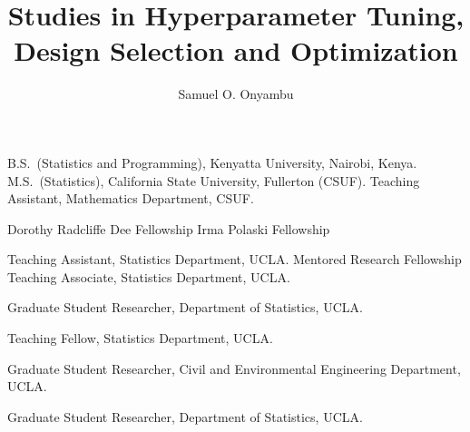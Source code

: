 


\title {Studies in Hyperparameter Tuning, Design Selection and Optimization}

\author{Samuel O. Onyambu}








\dedication{\textsl{To my parents, Joseph and Jane, ---\\
          and my siblings, Tabitha, Naomi, Jasper, and Lilian,---\\
          who among so many other things ensured that I gave my all to accomplish this task.}}


                {B.S.~(Statistics and Programming), Kenyatta University, Nairobi, Kenya.}
                {M.S.~(Statistics), California State University, Fullerton (CSUF).}
                {Teaching Assistant, Mathematics Department, CSUF.}

  {Dorothy Radcliffe Dee Fellowship}
   {Irma Polaski Fellowship}


               {Teaching Assistant, Statistics Department, UCLA.}
 {Mentored Research Fellowship}
               {Teaching Associate, Statistics Department, UCLA.} 

                {Graduate Student Researcher, Department of Statistics, UCLA.}

 {Teaching Fellow, Statistics Department, UCLA.} 

                {Graduate Student Researcher, Civil and Environmental Engineering Department, UCLA.}

                {Graduate Student Researcher, Department of Statistics, UCLA.}


\clearpage




